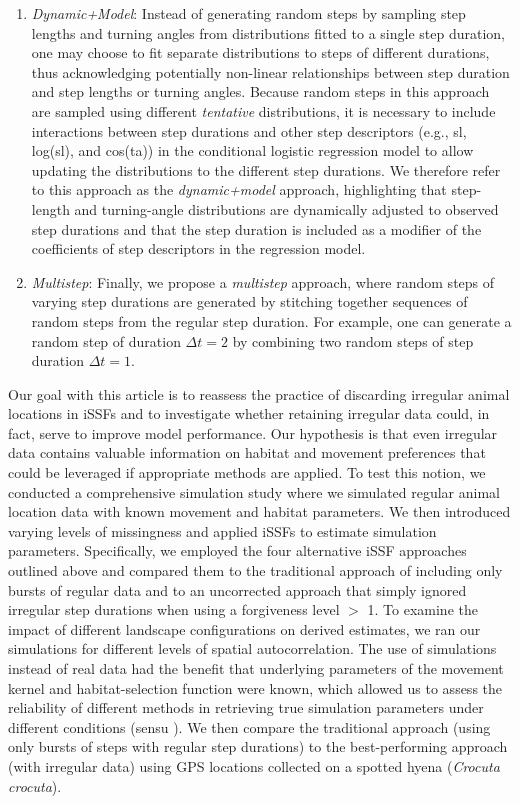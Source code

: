 \documentclass[abstract=on,10pt,a4paper,bibliography=totocnumbered]{article}
\begin{document}
\begin{enumerate}
  \item \textit{Dynamic+Model}: Instead of generating random steps by sampling
  step lengths and turning angles from distributions fitted to a single
  step duration, one may choose to fit separate distributions to steps of
  different durations, thus acknowledging potentially non-linear relationships
  between step duration and step lengths or turning angles. Because random steps
  in this approach are sampled using different \textit{tentative} distributions,
  it is necessary to include interactions between step durations and other
  step descriptors (e.g., sl, log(sl), and cos(ta)) in the conditional logistic
  regression model to allow updating the distributions to the different
  step durations. We therefore refer to this approach as the
  \textit{dynamic+model} approach, highlighting that step-length and
  turning-angle distributions are dynamically adjusted to observed
  step durations and that the step duration is included as a modifier of the
  coefficients of step descriptors in the regression model.

  \item \textit{Multistep}: Finally, we propose a \textit{multistep} approach,
  where random steps of varying step durations are generated by stitching
  together sequences of random steps from the regular step duration. For
  example, one can generate a random step of duration $\Delta t = 2$ by
  combining two random steps of step duration $\Delta t = 1$.

\end{enumerate}

\noindent Our goal with this article is to reassess the practice of discarding
irregular animal locations in iSSFs and to investigate whether retaining
irregular data could, in fact, serve to improve model performance. Our
hypothesis is that even irregular data contains valuable information on habitat
and movement preferences that could be leveraged if appropriate methods are
applied. To test this notion, we conducted a comprehensive simulation study
where we simulated regular animal location data with known movement and habitat
parameters. We then introduced varying levels of missingness and applied iSSFs
to estimate simulation parameters. Specifically, we employed the four
alternative iSSF approaches outlined above and compared them to the traditional
approach of including only bursts of regular data and to an uncorrected approach
that simply ignored irregular step durations when using a forgiveness level $>$
1. To examine the impact of different landscape configurations on derived
estimates, we ran our simulations for different levels of spatial
autocorrelation. The use of simulations instead of real data had the benefit
that underlying parameters of the movement kernel and habitat-selection function
were known, which allowed us to assess the reliability of different methods in
retrieving true simulation parameters under different conditions (sensu
\citealp{Kery.2016}). We then compare the traditional approach (using only
bursts of steps with regular step durations) to the best-performing approach
(with irregular data) using GPS locations collected on a spotted hyena
(\textit{Crocuta crocuta}).
\end{document}

